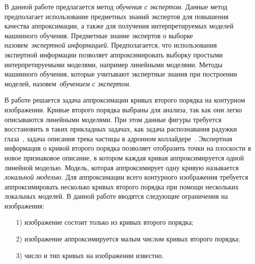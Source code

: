 \documentclass[12pt, twoside]{article}
\numberwithin{equation}{section}
\begin{document}
В данной работе предлагается метод \textit{обучения с экспертом}.
Данные метод предполагает использование предметных знаний экспертов для повышения качества аппроксимации, а также для получения интерпретируемых моделей машинного обучения.
Предметные знание экспертов о выборке назовем~\textit{экспертной информацией}.
Предполагается, что использования экспертной информации позволяет аппроксимировать выборку простыми интерпретируемыми моделями, например линейными моделями. Методы машинного обучения, которые учитывают экспертные знания при построении моделей, назовем~\textit{обучением с экспертом}.

В работе решается задача аппроксимации кривых второго порядка на контурном изображении. Кривые второго порядка выбраны для анализа, так как они легко описываются линейными моделями. При этом данные фигуры требуется восстановить в таких прикладных задачах, как задача распознавания радужки глаза~\cite{Matveev2010, Matveev2014, Bowyer2010}, задача описания трека частицы в адронном коллайдере~\cite{Dalila}. Экспертная информация о кривой второго порядка позволяет отобразить точки на плоскости в новое признаковое описание, в котором каждая кривая аппроксимируется одной линейной моделью. Модель, которая аппроксимирует одну кривую называется \textit{локальной моделью}. Для аппроксимации всего контурного изображения требуется аппроксимировать несколько кривых второго порядка при помощи нескольких локальных моделей. В данной работе вводятся следующие ограничения на изображения:
\begin{enumerate}
	\item[1)] изображение состоит только из кривых второго порядка;
	\item[2)] изображение аппроксимируется малым числом кривых второго порядка;
	\item[3)] число и тип кривых на изображении известно.
\end{enumerate}
\end{document}
